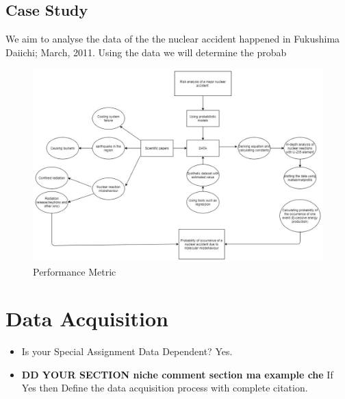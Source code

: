 \documentclass{article}
\begin{document}
\subsection{Case Study}
We aim to analyse the data of the the nuclear accident happened in Fukushima Daiichi; March, 2011. Using the data we will determine the probab


\begin{figure}
    \centering
  \includegraphics[scale=0.5]{Metric.jpg}
    \caption{Performance Metric}
    \label{fig:my_label}
\end{figure}


\section{Data Acquisition }

\begin{itemize}
    \item Is your Special Assignment Data Dependent? Yes.

    \item \textbf{DD YOUR SECTION niche comment section ma example che}
    If Yes then Define the data acquisition process with complete citation.
\end{itemize}
\end{document}
